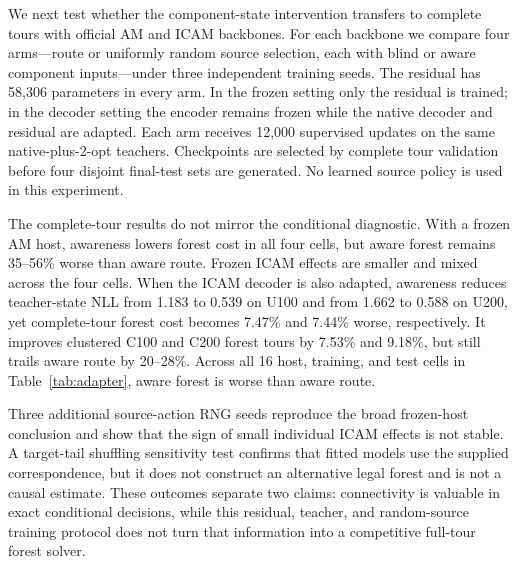 We next test whether the component-state intervention transfers to complete
tours with official AM and ICAM backbones.  For each backbone we compare four
arms---route or uniformly random source selection, each with blind or aware
component inputs---under three independent training seeds.  The residual has
58,306 parameters in every arm.  In the frozen setting only the residual is
trained; in the decoder setting the encoder remains frozen while the native
decoder and residual are adapted.  Each arm receives 12,000 supervised updates
on the same native-plus-2-opt teachers.  Checkpoints are selected by complete
tour validation before four disjoint final-test sets are generated.  No learned
source policy is used in this experiment.

\begin{table}[t]
\centering\scriptsize
\resizebox{\linewidth}{!}{}
\caption{Complete-tour cost for official-backbone interventions (lower is
better). B/A denote blind/aware component inputs. Forest uses a uniformly
random open source; route continues the current path. Each learned entry is
the mean of three training seeds. Frozen and decoder-adapted suites use
different final-test seeds and are not paired across training phases.}
\label{tab:adapter}
\end{table}

The complete-tour results do not mirror the conditional diagnostic.  With a
frozen AM host, awareness lowers forest cost in all four cells, but aware forest
remains 35--56\% worse than aware route.  Frozen ICAM effects are smaller and
mixed across the four cells.  When the ICAM decoder is also adapted, awareness
reduces teacher-state NLL from 1.183 to 0.539 on U100 and from 1.662 to 0.588 on
U200, yet complete-tour forest cost becomes 7.47\% and 7.44\% worse,
respectively.  It improves clustered C100 and C200 forest tours by 7.53\% and
9.18\%, but still trails aware route by 20--28\%.  Across all 16 host, training,
and test cells in Table~\ref{tab:adapter}, aware forest is worse than aware
route.

Three additional source-action RNG seeds reproduce the broad frozen-host
conclusion and show that the sign of small individual ICAM effects is not
stable.  A target-tail shuffling sensitivity test confirms that fitted models
use the supplied correspondence, but it does not construct an alternative
legal forest and is not a causal estimate.  These outcomes separate two claims:
connectivity is valuable in exact conditional decisions, while this residual,
teacher, and random-source training protocol does not turn that information
into a competitive full-tour forest solver.
